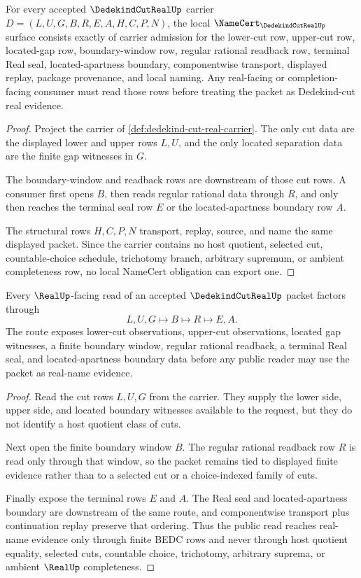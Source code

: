 \begin{theorem}
\label{thm:dedekind-cut-real-namecert-obligations}
For every accepted $\DedekindCutRealUp$ carrier $D=(L,U,G,B,R,E,A,H,C,P,N)$, the local $\NameCert_{\DedekindCutRealUp}$ surface consists exactly of carrier admission for the lower-cut row, upper-cut row, located-gap row, boundary-window row, regular rational readback row, terminal Real seal, located-apartness boundary, componentwise transport, displayed replay, package provenance, and local naming. Any real-facing or completion-facing consumer must read those rows before treating the packet as Dedekind-cut real evidence.
\end{theorem}
\begin{proof}
Project the carrier of \autoref{def:dedekind-cut-real-carrier}. The only cut data are the displayed lower and upper rows $L,U$, and the only located separation data are the finite gap witnesses in $G$.

The boundary-window and readback rows are downstream of those cut rows. A consumer first opens $B$, then reads regular rational data through $R$, and only then reaches the terminal seal row $E$ or the located-apartness boundary row $A$.

The structural rows $H,C,P,N$ transport, replay, source, and name the same displayed packet. Since the carrier contains no host quotient, selected cut, countable-choice schedule, trichotomy branch, arbitrary supremum, or ambient completeness row, no local NameCert obligation can export one.
\end{proof}

\begin{theorem}
\label{thm:dedekind-cut-real-located-cut-boundary}
Every $\RealUp$-facing read of an accepted $\DedekindCutRealUp$ packet factors through
$$
L,U,G \longmapsto B \longmapsto R \longmapsto E,A .
$$
The route exposes lower-cut observations, upper-cut observations, located gap witnesses, a finite boundary window, regular rational readback, a terminal Real seal, and located-apartness boundary data before any public reader may use the packet as real-name evidence.
\end{theorem}
\begin{proof}
Read the cut rows $L,U,G$ from the carrier. They supply the lower side, upper side, and located boundary witnesses available to the request, but they do not identify a host quotient class of cuts.

Next open the finite boundary window $B$. The regular rational readback row $R$ is read only through that window, so the packet remains tied to displayed finite evidence rather than to a selected cut or a choice-indexed family of cuts.

Finally expose the terminal rows $E$ and $A$. The Real seal and located-apartness boundary are downstream of the same route, and componentwise transport plus continuation replay preserve that ordering. Thus the public read reaches real-name evidence only through finite BEDC rows and never through host quotient equality, selected cuts, countable choice, trichotomy, arbitrary suprema, or ambient $\RealUp$ completeness.
\end{proof}

